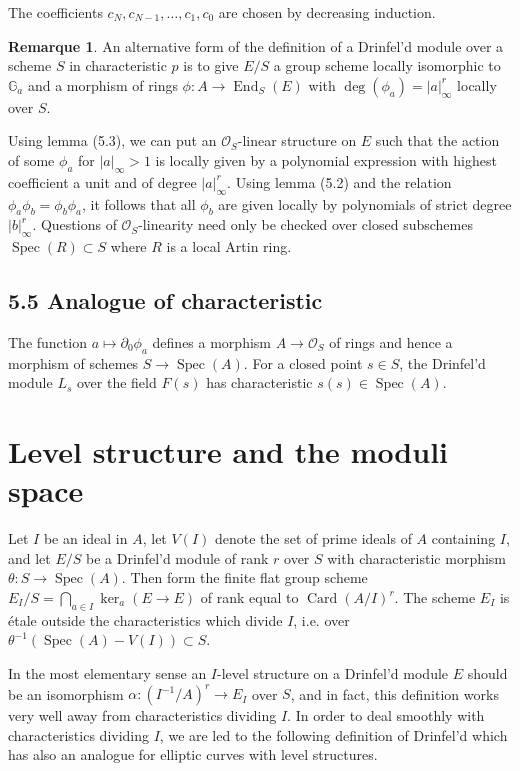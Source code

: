 \documentclass[12pt,a4paper]{article}
\theoremstyle{plain}
\theoremstyle{definition}
\newtheorem{remark}{Remarque}[section]
\theoremstyle{remark}
\DeclareMathOperator{\End}{End}
\DeclareMathOperator{\Spec}{Spec}
\DeclareMathOperator{\Card}{Card}
\begin{document}
The coefficients $c_N, c_{N-1}, \ldots, c_1, c_0$ are chosen by decreasing 
induction.

\begin{remark}
An alternative form of the definition of a Drinfel'd module over a scheme $S$ 
in characteristic $p$ is to give $E/S$ a group scheme locally isomorphic to 
$\mathbb{G}_a$ and a morphism of rings $\phi\colon A \to \End_S(E)$ with 
$\deg(\phi_a) = |a|_\infty^r$ locally over $S$.

Using lemma (5.3), we can put an $\mathcal{O}_S$-linear structure on $E$ such 
that the action of some $\phi_a$ for $|a|_\infty > 1$ is locally given by a 
polynomial expression with highest coefficient a unit and of degree 
$|a|_\infty^r$. Using lemma (5.2) and the relation 
$\phi_a \phi_b = \phi_b \phi_a$, it follows that all $\phi_b$ are given locally 
by polynomials of strict degree $|b|_\infty^r$. Questions of 
$\mathcal{O}_S$-linearity need only be checked over closed subschemes 
$\Spec(R) \subset S$ where $R$ is a local Artin ring.
\end{remark}

\subsection*{5.5 Analogue of characteristic}

The function $a \mapsto \partial_0\phi_a$ defines a morphism $A \to \mathcal{O}_S$ 
of rings and hence a morphism of schemes $S \to \Spec(A)$. For a closed point 
$s \in S$, the Drinfel'd module $L_s$ over the field $F(s)$ has characteristic 
$s(s) \in \Spec(A)$.


\section{Level structure and the moduli space}

Let $I$ be an ideal in $A$, let $V(I)$ denote the set of prime ideals of $A$ 
containing $I$, and let $E/S$ be a Drinfel'd module of rank $r$ over $S$ with 
characteristic morphism $\theta\colon S \to \Spec(A)$. Then form the finite flat 
group scheme $E_I/S = \bigcap_{a \in I} \ker_a(E \to E)$ of rank equal to 
$\Card(A/I)^r$. The scheme $E_I$ is \'etale outside the characteristics which 
divide $I$, i.e. over $\theta^{-1}(\Spec(A) - V(I)) \subset S$.

In the most elementary sense an $I$-level structure on a Drinfel'd module $E$ 
should be an isomorphism $\alpha\colon (I^{-1}/A)^r \to E_I$ over $S$, and in 
fact, this definition works very well away from characteristics dividing $I$. 
In order to deal smoothly with characteristics dividing $I$, we are led to the 
following definition of Drinfel'd which has also an analogue for elliptic 
curves with level structures.
\end{document}
